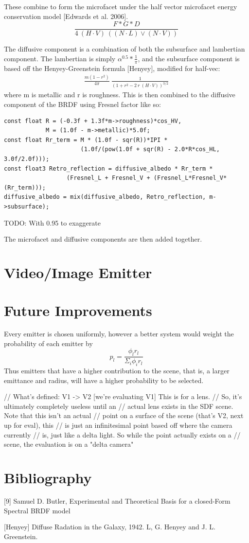 \message{ !name(test.tex)}\documentclass{article}
\begin{document}
  These combine to form the microfacet under the half vector microfacet energy
conservation model [Edwards et al. 2006].
  \[
  	\frac{F*G*D}{4 \: (H \cdot V) \: ( (N \cdot L) \vee (N \cdot V) )}
  \]
  
  The diffusive component is a combination of both the subsurface and lambertian
component. The lambertian is simply $\alpha^{0.5} * \frac{1}{\pi}$, and the
subsurface component is based off the Henyey-Greenstein formula [Henyey],
modified for half-vec:
  \begin{align}
  	\frac{m(1 - r^2)}{4\pi}\:\frac{1}{(1 + r^2 - 2\:r\:
  		(H \cdot V))^{3/2}}
  \end{align}
  where m is metallic and r is roughness. This is then combined to the diffusive
component of the BRDF using Fresnel factor like so:
  \begin{lstlisting}
const float R = (-0.3f + 1.3f*m->roughness)*cos_HV,
            M = (1.0f - m->metallic)*5.0f;
const float Rr_term = M * (1.0f - sqr(R))*IPI *
                      (1.0f/(pow(1.0f + sqr(R) - 2.0*R*cos_HL, 3.0f/2.0f)));
const float3 Retro_reflection = diffusive_albedo * Rr_term *
                  (Fresnel_L + Fresnel_V + (Fresnel_L*Fresnel_V*(Rr_term)));
diffusive_albedo = mix(diffusive_albedo, Retro_reflection, m->subsurface);

  \end{lstlisting}
  TODO: With 0.95 to exaggerate
  
  The microfacet and diffusive components are then added together.

  \section{Video/Image Emitter}

  \section{Future Improvements}

  Every emitter is chosen uniformly, however a better system would weight the
  probability of each emitter by
  \[
    p_l = \frac{\phi_lr_l}{\Sigma_i\phi_ir_l}
  \]
  Thus emitters that have a higher contribution to the scene, that is, a larger
  emittance and radius, will have a higher probability to be selected.

 
        // What's defined: V1 -> V2 [we're evaluating V1] This is for a lens.
        // So, it's ultimately completely useless until an
        // actual lens exists in the SDF scene. Note that this isn't an actual
        // point on a surface of the scene (that's V2, next up for eval), this
        // is just an infinitesimal point based off where the camera currently
        // is, just like a delta light. So while the point actually exists on a
        // scene, the evaluation is on a "delta camera"
  
  \section{Bibliography}
  [9]
  Samuel D. Butler, Experimental and Theoretical Basis for a closed-Form Spectral BRDF model
  
  [Henyey]
   Diffuse Radation in the Galaxy, 1942. L, G. Henyey and J. L. Greenstein. 
\end{document}
